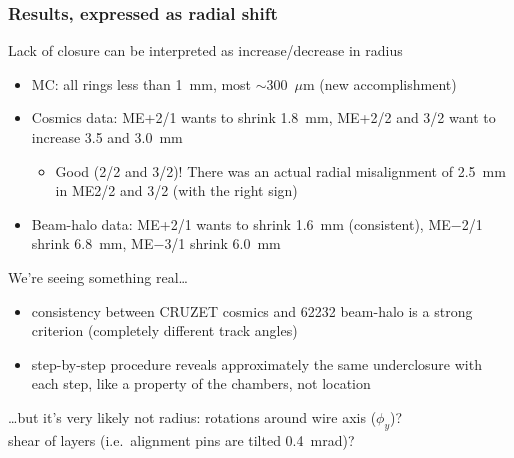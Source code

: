 \documentclass[compress]{beamer}
\begin{document}
\begin{frame}
\frametitle{Results, expressed as radial shift}
\small

Lack of closure can be interpreted as increase/decrease in radius

\begin{itemize}
\item MC: all rings less than 1~mm, most $\sim$300~$\mu$m (new accomplishment)
\item Cosmics data: ME+2/1 wants to shrink 1.8~mm, ME+2/2 and 3/2 want to increase 3.5 and 3.0~mm
\begin{itemize}
\item Good (2/2 and 3/2)! There was an actual radial misalignment of 2.5~mm in ME2/2 and 3/2 (with the right sign)
\end{itemize}
\item Beam-halo data: ME+2/1 wants to shrink 1.6~mm (consistent), ME$-$2/1 shrink 6.8~mm, ME$-$3/1 shrink 6.0~mm
\end{itemize}

\vspace{0.2 cm}
We're seeing something real\ldots
\begin{itemize}
\item consistency between CRUZET cosmics and 62232 beam-halo is a
  strong criterion (completely different track angles)
\item step-by-step procedure reveals approximately the same
  underclosure with each step, like a property of the chambers, not
  location
\end{itemize}

\vspace{0.1 cm}
\ldots but it's very likely not radius: rotations around wire axis ($\phi_y$)? \\
shear of layers (i.e.\ alignment pins are tilted 0.4~mrad)?
\end{frame}
\end{document}

